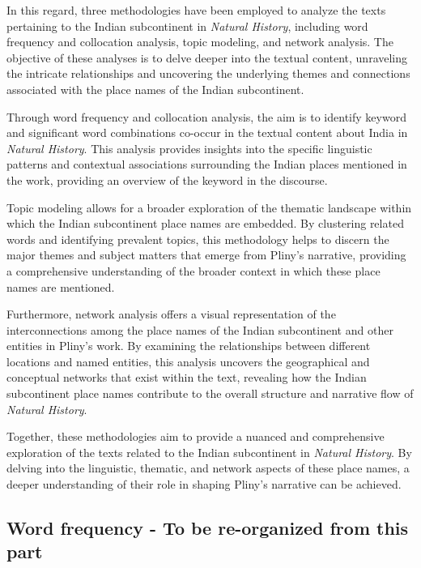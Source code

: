 \documentclass[
  12pt,
]{article}
\begin{document}
In this regard, three methodologies have been employed to analyze the
texts pertaining to the Indian subcontinent in \emph{Natural History},
including word frequency and collocation analysis, topic modeling, and
network analysis. The objective of these analyses is to delve deeper
into the textual content, unraveling the intricate relationships and
uncovering the underlying themes and connections associated with the
place names of the Indian subcontinent.

Through word frequency and collocation analysis, the aim is to identify
keyword and significant word combinations co-occur in the textual
content about India in \emph{Natural History}. This analysis provides
insights into the specific linguistic patterns and contextual
associations surrounding the Indian places mentioned in the work,
providing an overview of the keyword in the discourse.

Topic modeling allows for a broader exploration of the thematic
landscape within which the Indian subcontinent place names are embedded.
By clustering related words and identifying prevalent topics, this
methodology helps to discern the major themes and subject matters that
emerge from Pliny's narrative, providing a comprehensive understanding
of the broader context in which these place names are mentioned.

Furthermore, network analysis offers a visual representation of the
interconnections among the place names of the Indian subcontinent and
other entities in Pliny's work. By examining the relationships between
different locations and named entities, this analysis uncovers the
geographical and conceptual networks that exist within the text,
revealing how the Indian subcontinent place names contribute to the
overall structure and narrative flow of \emph{Natural History}.

Together, these methodologies aim to provide a nuanced and comprehensive
exploration of the texts related to the Indian subcontinent in
\emph{Natural History}. By delving into the linguistic, thematic, and
network aspects of these place names, a deeper understanding of their
role in shaping Pliny's narrative can be achieved.

\hypertarget{word-frequency---to-be-re-organized-from-this-part}{%
\subsection{Word frequency - To be re-organized from this
part}\label{word-frequency---to-be-re-organized-from-this-part}}
\end{document}
